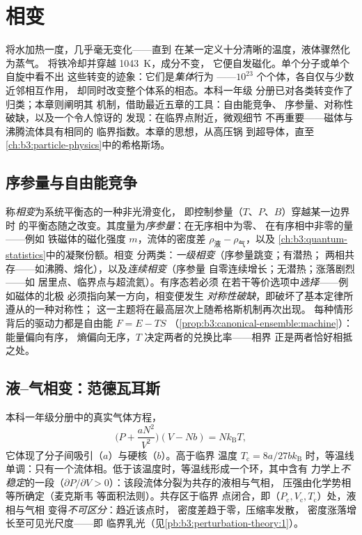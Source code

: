 \chapter{相变}\label{ch:b3:phase-transitions}

将水加热一度，几乎毫无变化——直到
在某一定义十分清晰的温度，液体骤然化为蒸气。
将铁冷却并穿越 \qty{1043}{K}，成分不变，
它便自发磁化。单个分子或单个自旋中看不出
这些转变的迹象：它们是\emph{集体}行为
——$10^{23}$ 个个体，各自仅与少数近邻相互作用，
却同时改变整个体系的相态。本科一年级
分册已对各类转变作了归类；本章则阐明其
机制，借助最近五章的工具：自由能竞争、
序参量、对称性破缺，以及一个令人惊讶的
发现：在临界点附近，微观细节
不再重要——磁体与沸腾流体具有相同的
临界指数。本章的思想，从高压锅
到超导体，直至
\cref{ch:b3:particle-physics}中的希格斯场。

\section{序参量与自由能竞争}

\begin{definition}[相与序参量]\label{def:b3:phase-transitions:order}
称\emph{相变}为系统平衡态的一种非光滑变化，
即控制参量（$T$、$P$、$B$）穿越某一边界时
的平衡态随之改变。其度量为\emph{序参量}：在无序相中为零、
在有序相中非零的量——例如
铁磁体的磁化强度 $m$，流体的密度差
$\rho_{\text{液}} - \rho_{\text{气}}$，以及
\cref{ch:b3:quantum-statistics}中的凝聚份额。相变
分两类：\emph{一级相变}（序参量跳变；有潜热；
两相共存——如沸腾、熔化），以及\emph{连续相变}（序参量
自零连续增长；无潜热；涨落剧烈——如
居里点、临界点与超流氦）。有序态若必须
在若干等价选项中\emph{选择}——例如磁体的北极
必须指向某一方向，相变便发生
\emph{对称性破缺}，即破坏了基本定律所遵从的一种对称性；
这一主题将在最高层次上随希格斯机制再次出现。
每种情形背后的驱动力都是自由能 $F = E - TS$
（\cref{prop:b3:canonical-ensemble:machine}）：能量偏向有序，
熵偏向无序，$T$ 决定两者的兑换比率——相界
正是两者恰好相抵之处。
\end{definition}

\section{液–气相变：范德瓦耳斯}

\begin{proposition}[范德瓦耳斯等温线]\label{prop:b3:phase-transitions:vdw}
本科一年级分册中的真实气体方程，
\[
\Big(P + \frac{aN^2}{V^2}\Big)(V - Nb) = Nk_{\text{B}}T ,
\]
它体现了分子间吸引（$a$）与硬核（$b$）。高于临界
温度 $T_{\text{c}} = 8a/27bk_{\text{B}}$ 时，等温线
单调：只有一个流体相。低于该温度时，等温线形成一个环，其中含有
力学上\emph{不稳定}的一段（$\partial P/\partial V >
0$）：该段流体分裂为共存的液相与气相，
压强由化学势相等所确定（麦克斯韦
等面积法则）。共存区于临界
点闭合，即（$P_{\text{c}}, V_{\text{c}}, T_{\text{c}}$）处，液相与气相
变得\emph{不可区分}：趋近该点时，
密度差趋于零，压缩率发散，
密度涨落增长至可见光尺度——即
临界乳光（见\cref{pb:b3:perturbation-theory:1}）。
\end{proposition}
\admitted

